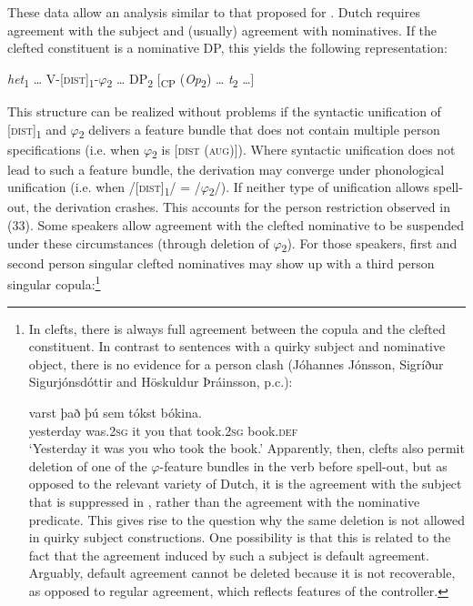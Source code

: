 \documentclass[output=paper]{langsci/langscibook}
\begin{document}
These data allow an analysis similar to that proposed for . Dutch requires agreement with the subject and (usually) agreement with nominatives. If the clefted constituent is a nominative DP, this yields the following representation: 

\ea 
 \textit{het}\textsubscript{1} … V-[\textsc{dist}]\textsubscript{1}{}-$\varphi $\textsubscript{2} … DP\textsubscript{2} [\textsubscript{CP} (\textit{Op}\textsubscript{2}) … \textit{t}\textsubscript{2} …]
\z

This structure can be realized without problems if the syntactic unification of [\textsc{dist}]\textsubscript{1} and $\varphi $\textsubscript{2} delivers a feature bundle that does not contain multiple person specifications (i.e. when $\varphi $\textsubscript{2} is [\textsc{dist} (\textsc{aug})]). Where syntactic unification does not lead to such a feature bundle, the derivation may converge under phonological unification (i.e. when /[\textsc{dist}]\textsubscript{1}/ = /$\varphi $\textsubscript{2}/). If neither type of unification allows spell-out, the derivation crashes. This accounts for the person restriction observed in (33). Some speakers allow agreement with the clefted nominative to be suspended under these circumstances (through deletion of $\varphi $\textsubscript{2}). For those speakers, first and second person singular clefted nominatives may show up with a third person singular copula:\footnote{In  clefts, there is always full agreement between the copula and the clefted constituent. In contrast to sentences with a quirky subject and nominative object, there is no evidence for a person clash (Jóhannes Jónsson, Sigríður Sigurjónsdóttir and Höskuldur Þráinsson, p.c.):

\ea {}        varst       það þú   sem tókst       bókina. \\
         yesterday was.\textsc{2sg} it     you that took.\textsc{2sg} book.\textsc{def}\\
    \glt ‘Yesterday it was you who took the book.’
\z Apparently, then,  clefts also permit deletion of one of the $\varphi $-feature bundles in the verb before spell-out, but as opposed to the relevant variety of Dutch, it is the agreement with the subject that is suppressed in , rather than the agreement with the nominative predicate. This gives rise to the question why the same deletion is not allowed in quirky subject constructions. One possibility is that this is related to the fact that the agreement induced by such a subject is default agreement. Arguably, default agreement cannot be deleted because it is not recoverable, as opposed to regular agreement, which reflects features of the controller.}
\end{document}
